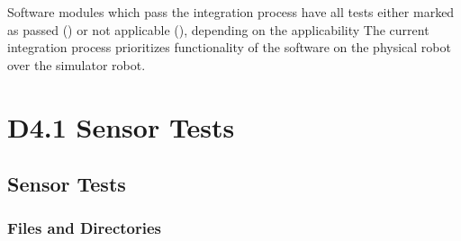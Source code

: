 \documentclass{CSSRforAfrica}
\newcommand{\checkboxChecked}{\fbox{\ding{51}}} %
\newcommand{\checkboxCrossed}{\fbox{\ding{55}}} %
\newcommand{\checkboxDashed}{\fbox{--}}         %
\begin{document}
\noindent Software modules which pass the integration process have all tests either marked as passed (\checkboxChecked) or not applicable (\checkboxDashed), depending on the applicability
The current integration process prioritizes functionality of the software on the physical robot over the simulator robot.


\newpage
 
 
\pagebreak
\tableofcontents
\newpage




\section{D4.1 Sensor Tests}

\subsection{Sensor Tests}

\subsubsection{Files and Directories}
\end{document}
